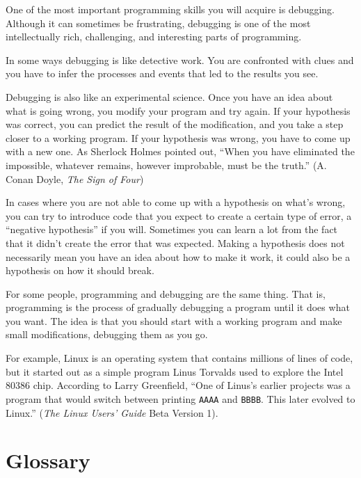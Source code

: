One of the most important programming skills you will 
acquire is debugging. Although it can sometimes be 
frustrating, debugging is one of the most intellectually 
rich, challenging, and interesting parts of programming.

In some ways debugging is like detective work.  You are confronted
with clues and you have to infer the processes and events that led
to the results you see.

Debugging is also like an experimental science.  Once you have an idea
about what is going wrong, you modify your program and try again.  If
your hypothesis was correct, you can predict the result of the
modification, and you take a step closer to a working program.  If
your hypothesis was wrong, you have to come up with a new one.  As
Sherlock Holmes pointed out, ``When you have eliminated the
impossible, whatever remains, however improbable, must be the truth.''
(A. Conan Doyle, {\em The Sign of Four})

In cases where you are not able to come up with a hypothesis 
on what's wrong, you can try to introduce code that you expect 
to create a certain type of error, a ``negative hypothesis'' 
if you will.  Sometimes you can learn a lot from the fact that 
it didn't create the error that was expected. Making a hypothesis 
does not necessarily mean you have an idea about how to make it 
work, it could also be a hypothesis on how it should break.

For some people, programming and debugging are the same thing.  That
is, programming is the process of gradually debugging a program until
it does what you want.  The idea is that you should start with a
working program and make small modifications,
debugging them as you go.

For example, Linux is an operating system that contains millions of
lines of code, but it started out as a simple program Linus Torvalds
used to explore the Intel 80386 chip.  According to Larry Greenfield,
``One of Linus's earlier projects was a program that would switch
between printing \verb"AAAA" and \verb"BBBB".  This later evolved 
to Linux.'' ({\em The Linux Users' Guide} Beta Version 1).


\section{Glossary}


